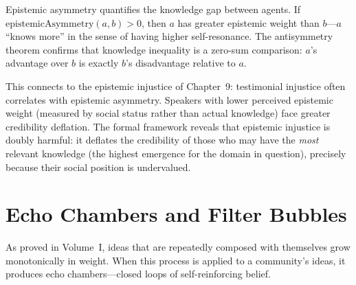 \begin{interpretation}
Epistemic asymmetry quantifies the knowledge gap between agents. If
$\mathrm{epistemicAsymmetry}(a, b) > 0$, then $a$ has greater epistemic
weight than $b$---$a$ ``knows more'' in the sense of having higher self-resonance.
The antisymmetry theorem confirms that knowledge inequality is a zero-sum
comparison: $a$'s advantage over $b$ is exactly $b$'s disadvantage relative
to $a$.

This connects to the epistemic injustice of Chapter~9: testimonial injustice
often correlates with epistemic asymmetry. Speakers with lower perceived
epistemic weight (measured by social status rather than actual knowledge) face
greater credibility deflation. The formal framework reveals that epistemic
injustice is doubly harmful: it deflates the credibility of those who may
have the \emph{most} relevant knowledge (the highest emergence for the domain
in question), precisely because their social position is undervalued.
\end{interpretation}


\section{Echo Chambers and Filter Bubbles}

As proved in Volume~I, ideas that are repeatedly composed with themselves grow
monotonically in weight. When this process is applied to a community's ideas,
it produces echo chambers---closed loops of self-reinforcing belief.

